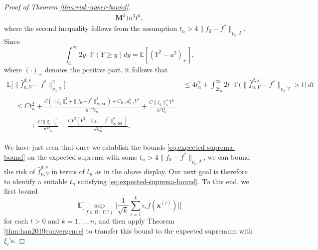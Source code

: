 \documentclass[10pt]{article}
\newcommand{\E}{{\mathbb E}}
\renewcommand{\P}{{\mathbb P}}
\newcommand{\lsefstinf}{{\hat{f}^{d, s}_{n, V}}}
\newcommand{\xbf}{{\mathbf{x}}}
\newcommand{\Mbf}{{\mathbf{M}}}
\begin{document}
\begin{proof}[Proof of Theorem \ref{thm:risk-upper-bound}]
\begin{equation*}
\begin{aligned}
{{    \Mbf}^3)}{n^3 t^6},
\end{aligned}
\end{equation*}
where the second inequality follows from the assumption 
$t_n > 4 \|f_0 - f^*\|_{p_0, 2}$. Since 
\begin{equation*}
    \int_{a}^{\infty} 2y \cdot \P(Y \ge y) dy = \E[(Y^2 - a^2)_+],
\end{equation*}
where $(\cdot)_+$ denotes the positive part, it follows that
\begin{align}\label{eq:risk-bound-t-n}
    \E\big[\|\lsefstinf - f^*\|_{p_0, 2}^2\big]
    &\le 4t_n^2 
    + \int_{2t_n}^{\infty} 2t \cdot 
    \P\big(\|\lsefstinf - f^*\|_{p_0, 2} > t\big) \, dt \nonumber \\ 
    \begin{split}
    &\le C t_n^2 
    + \frac{C (\|\xi_1\|_2^3 + \|f_{0} - f^*\|_{\infty, 
    \Mbf}^3) + C_{B, s} a_{d, s}^6 V^3}{n^{3/2} t_n}
    + \frac{C\|\xi_1\|_3^3 V^3}{n^2 t_n^4} \\
    &\qquad
    + \frac{C\|\xi_1\|_3^3}{n^2 t_n} 
    + \frac{CV^3(V^3 + \|f_{0} - f^*\|_{\infty, 
    \Mbf}^3)}{n^3 t_n^4}.
    \end{split}
\end{align}
    
We have just seen that once we establish the bounds 
\eqref{eq:expected-suprema-bound} on the expected suprema with some 
$t_n > 4 \|f_0 - f^*\|_{p_0, 2}$, 
we can bound the risk of $\lsefstinf$ in terms of $t_n$ as in the above display.
Our next goal is therefore to identify a suitable $t_n$ satisfying 
\eqref{eq:expected-suprema-bound}.
To this end, we first bound 
\begin{equation*}
    \E\Big[\sup_{f \in B(V, t)} \Big|\frac{1}{\sqrt{k}}
    \sum_{i = 1}^{k} \epsilon_i f(\xbf^{(i)})\Big|\Big]
\end{equation*}
for each $t > 0$ and $k = 1, \dots, n$, and then apply 
Theorem \ref{thm:han2019convergence} to transfer this bound to the expected 
supremum with $\xi_i$'s.
    

\end{proof}
\end{document}
